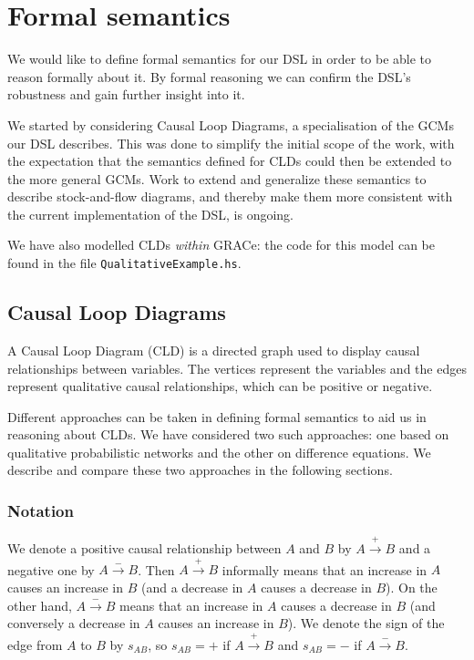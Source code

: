 \section{Formal semantics}
\label{sec:semantics}
We would like to define formal semantics for our DSL in order to be
able to reason formally about it.
%
By formal reasoning we can confirm the DSL's robustness and gain
further insight into it.

We started by considering Causal Loop Diagrams, a specialisation of
the GCMs our DSL describes.
%
This was done to simplify the initial scope of the work, with the
expectation that the semantics defined for CLDs could then be extended
to the more general GCMs.
%
Work to extend and generalize these semantics to describe
stock-and-flow diagrams, and thereby make them more consistent with
the current implementation of the DSL, is ongoing.

We have also modelled CLDs \emph{within} GRACe: the code for this
model can be found in the file \verb|QualitativeExample.hs|.

\subsection{Causal Loop Diagrams}
%
A Causal Loop Diagram (CLD) is a directed graph used to display causal
relationships between variables.
%
The vertices represent the variables and the edges represent
qualitative causal relationships, which can be positive or negative.

Different approaches can be taken in defining formal semantics to aid
us in reasoning about CLDs.
%
We have considered two such approaches: one based on qualitative
probabilistic networks and the other on difference equations.
%
We describe and compare these two approaches in the following
sections.

\subsubsection{Notation}
We denote a positive causal relationship between $A$ and $B$ by
$A\xrightarrow{+} B$ and a negative one by $A \xrightarrow{-} B$.
%
Then $A \xrightarrow{+} B$ informally means that an increase in $A$
causes an increase in $B$ (and a decrease in $A$ causes a decrease in
$B$).
%
On the other hand, $A\xrightarrow{-} B$ means that an increase in $A$
causes a decrease in $B$ (and conversely a decrease in $A$ causes an
increase in $B$).
%
We denote the sign of the edge from $A$ to $B$ by $s_{AB}$, so
$s_{AB}= +$ if $A\xrightarrow{+} B$ and $s_{AB}=-$ if
$A\xrightarrow{-} B$.

